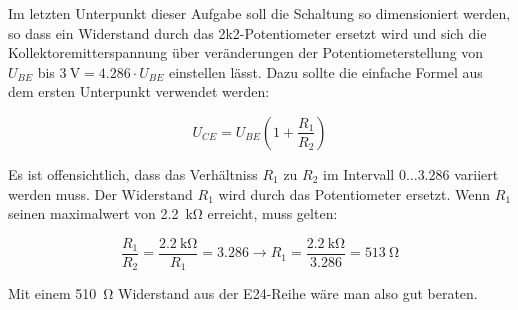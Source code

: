 Im letzten Unterpunkt dieser Aufgabe soll die Schaltung so dimensioniert werden, so dass ein Widerstand durch das 2k2-Potentiometer ersetzt wird und sich die Kollektoremitterspannung über veränderungen der Potentiometerstellung von $U_{BE}$ bis $\SI{3}{\volt}=4.286 \cdot U_{BE}$ einstellen lässt. Dazu sollte die einfache Formel aus dem ersten Unterpunkt verwendet werden:

\begin{equation*}
     U_{CE} = U_{BE} \left( 1 + \frac{R_1}{R_2} \right)
\end{equation*}

Es ist offensichtlich, dass das Verhältniss $R_1$ zu $R_2$ im Intervall $0 \ldots 3.286$ variiert werden muss. Der Widerstand $R_1$ wird durch das Potentiometer ersetzt. Wenn $R_1$ seinen maximalwert von \SI{2.2}{\kilo \ohm} erreicht, muss gelten:

\begin{equation*}
    \frac{R_1}{R_2} = \frac{\SI{2.2}{\kilo \ohm}}{R_1} = 3.286 \rightarrow R_1 = \frac{\SI{2.2}{\kilo \ohm}}{3.286} = \SI{513}{\ohm}
\end{equation*}

Mit einem \SI{510}{\ohm} Widerstand aus der E24-Reihe wäre man also gut beraten.